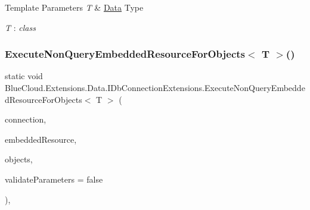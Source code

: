 \begin{DoxyTemplParams}{Template Parameters}
{\em T} & \mbox{\hyperlink{namespace_blue_cloud_1_1_extensions_1_1_data}{Data}} Type\\
\hline
\end{DoxyTemplParams}
\begin{Desc}
\item[Type Constraints]\begin{description}
\item[{\em T} : {\em class}]\end{description}
\end{Desc}
\mbox{\label{class_blue_cloud_1_1_extensions_1_1_data_1_1_i_db_connection_extensions_a03e05fb2dd4ab39d85a77addd01b12e1}} 
\subsubsection{\texorpdfstring{Execute\+Non\+Query\+Embedded\+Resource\+For\+Objects$<$ T $>$()}{ExecuteNonQueryEmbeddedResourceForObjects< T >()}\hspace{0.1cm}{\footnotesize\ttfamily [1/2]}}
{\footnotesize\ttfamily static void Blue\+Cloud.\+Extensions.\+Data.\+I\+Db\+Connection\+Extensions.\+Execute\+Non\+Query\+Embedded\+Resource\+For\+Objects$<$ T $>$ (\begin{DoxyParamCaption}\item[{this I\+Db\+Connection}]{connection,  }\item[{string}]{embedded\+Resource,  }\item[{I\+Enumerable$<$ T $>$}]{objects,  }\item[{bool}]{validate\+Parameters = {\ttfamily false} }\end{DoxyParamCaption})\hspace{0.3cm}{\ttfamily [inline]}, {\ttfamily [static]}}



